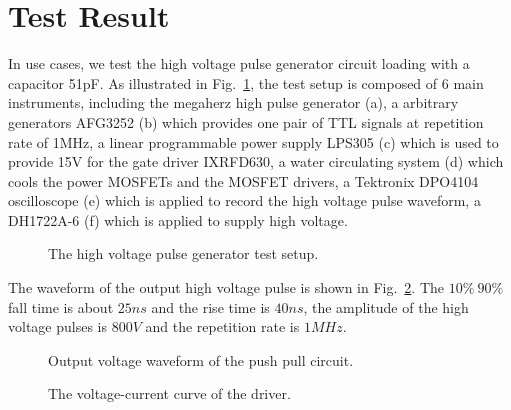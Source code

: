 \documentclass[aip,rsi,reprint,graphicx]{revtex4-1} %
\begin{document}
\section{Test Result}
In use cases, we test the high voltage pulse generator circuit loading with a capacitor 51pF.  As illustrated in Fig.~\ref{FIG3}, the test setup is composed of 6 main instruments, including the megaherz high pulse generator (a), a arbitrary generators AFG3252 (b) which provides one pair of  TTL signals at repetition rate of 1MHz, a  linear programmable power supply LPS305 (c) which is used to provide 15V for the gate driver IXRFD630, a water circulating system (d) which cools the power MOSFETs and the MOSFET drivers,  
a Tektronix DPO4104 oscilloscope (e) which is applied to record the high voltage pulse waveform, a DH1722A-6 (f) which is applied to supply high voltage.
\begin{figure}[hbt]
\caption{The high voltage pulse generator test setup. \label{FIG3}}%
\end{figure}
The waveform of the output high voltage pulse is shown in Fig.~\ref{Fig4}. The $10\%~90\%$ fall time is about $25ns$ and the rise time is $40 ns$, the amplitude of the high voltage pulses is $800V$ and the repetition rate is $1MHz$.
\begin{figure}[hbt]
\caption{Output voltage waveform of the push pull circuit.\label{Fig4}}%
\end{figure}

\begin{figure}
\caption{The voltage-current curve of the driver.\label{FIG5}}%
\end{figure}
\end{document}
